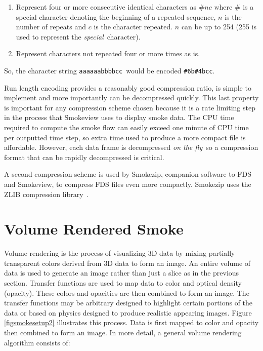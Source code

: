 \begin{enumerate}
\item Represent four or more consecutive identical characters as $\# n c$ where $\#$ is a special character denoting the beginning
of a repeated sequence, $n$ is the number of repeats and $c$ is the character repeated.  $n$ can be up to 254 (255 is used to
represent the {\em special}\ character). \item Represent characters not repeated four or more times as is.
\end{enumerate}

So, the character string {\tt aaaaaabbbbcc}\ would be encoded {\tt \#6b\#4bcc}.

Run length encoding provides a reasonably good compression ratio, is simple to implement and more importantly can be decompressed quickly. This last property is important for any compression scheme chosen because it is a rate limiting step in the process that Smokeview uses to display smoke data. The CPU time required to compute the smoke flow can easily exceed one minute of CPU time
per outputted time step, so extra time used to produce a more compact file is affordable. However, each data frame is decompressed {\em on the fly}\ so a compression format that can be rapidly decompressed is critical.

A second compression scheme is used by Smokezip, companion software to FDS and Smokeview, to compress FDS files even more compactly.  Smokezip uses the ZLIB compression library~\cite{ZLIB}.

%
%

\section{Volume Rendered Smoke}
Volume rendering is the process of visualizing 3D data by mixing partially transparent colors derived from 3D data to form an image.  An entire volume of data is used to generate an image rather than just a slice as in the previous section.  Transfer functions are used to map data to color and optical density (opacity).  These colors and opacities are then combined to form an image.  The transfer functions may be arbitrary designed to highlight certain portions of the data or based on physics designed to produce realistic appearing images.  Figure \ref{figsmokesetup2} illustrates this process.  Data is first mapped to color and opacity then combined to form an image.  In more detail, a general volume rendering algorithm consists of:


